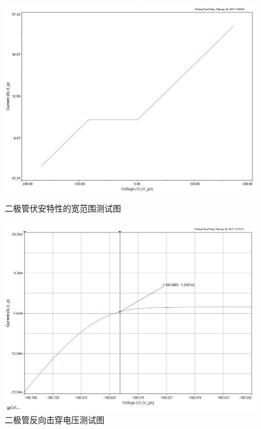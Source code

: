 \documentclass[UTF8,a4paper]{ctexart}
\begin{document}
\begin{figure}
\centering
\includegraphics[width=\textwidth]{cap/16.JPG}
\caption{二极管伏安特性的宽范围测试图}
\label{general}

\includegraphics[width=\textwidth]{cap/18.JPG}
\caption{二极管反向击穿电压测试图}
\label{break}
\end{figure}
\end{document}
